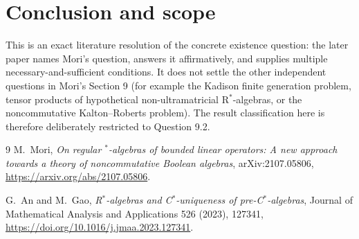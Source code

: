 \documentclass[11pt]{article}
\begin{document}
\section*{Conclusion and scope}

This is an exact literature resolution of the concrete existence question:
the later paper names Mori's question, answers it affirmatively, and supplies
multiple necessary-and-sufficient conditions.  It does not settle the other
independent questions in Mori's Section 9 (for example the Kadison finite
generation problem, tensor products of hypothetical non-ultramatricial
R$^*$-algebras, or the noncommutative Kalton--Roberts problem).  The result
classification here is therefore deliberately restricted to Question 9.2.

\begin{thebibliography}{9}
M.~Mori,
\emph{On regular $^*$-algebras of bounded linear operators: A new approach
towards a theory of noncommutative Boolean algebras},
arXiv:2107.05806,
\url{https://arxiv.org/abs/2107.05806}.

G.~An and M.~Gao,
\emph{R$^*$-algebras and C$^*$-uniqueness of pre-C$^*$-algebras},
Journal of Mathematical Analysis and Applications 526 (2023), 127341,
\url{https://doi.org/10.1016/j.jmaa.2023.127341}.
\end{thebibliography}
\end{document}
